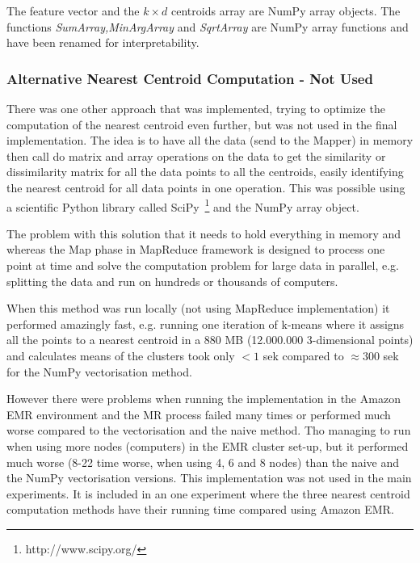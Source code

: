 The feature vector and the $k \times d$ centroids array are NumPy array objects. The functions \textit{SumArray,MinArgArray} and \textit{SqrtArray} are NumPy array functions and have been renamed for interpretability.


\subsubsection{Alternative Nearest Centroid Computation - Not Used}
\label{sec:alternativenearestcentroid}
There was one other approach that was implemented, trying to optimize the computation of the nearest centroid even further, but was not used in the final implementation. The idea is to have all the data (send to the Mapper) in memory then call do matrix and array operations on the data to get the similarity or dissimilarity matrix for all the data points to all the centroids, easily identifying the nearest centroid for all data points in one operation. This was possible using a scientific Python library called SciPy~\footnote{http://www.scipy.org/} and the NumPy array object.

The problem with this solution that it needs to hold everything in memory and whereas the Map phase in MapReduce framework is designed to process one point at time and solve the computation problem for large data in parallel, e.g. splitting the data and run on hundreds or thousands of computers.

When this method was run locally (not using MapReduce implementation) it performed amazingly fast, e.g. running one iteration of k-means where it assigns all the points to a nearest centroid in a $880$ MB (12.000.000 $3$-dimensional points) and calculates means of the clusters took only $<1$ sek compared to $\approx 300$ sek for the NumPy vectorisation method. 

However there were problems when running the implementation in the Amazon EMR environment and the MR process failed many times or performed much worse compared to the vectorisation and the naive method. Tho managing to run when using more nodes (computers) in the EMR cluster set-up, but it performed much worse (8-22 time worse, when using 4, 6 and 8 nodes) than the naive and the NumPy vectorisation versions. This implementation was not used in the main experiments. It is included in an one experiment where the three nearest centroid computation methods have their running time compared using Amazon EMR.

